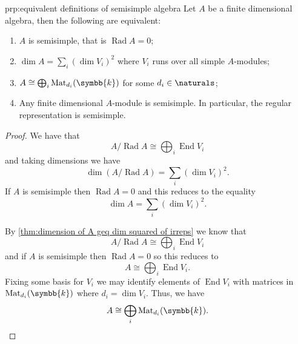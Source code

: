 \documentclass[fleqn]{NotesClass}
\renewcommand{\field}{\symbb{k}}
\DeclareMathOperator{\End}{End}
\newcommand{\isomorphic}{\cong}
\DeclareMathOperator{\Rad}{Rad}
\begin{document}
    \begin{prp}{}{prp:equivalent definitions of semisimple algebra}
        Let \(A\) be a finite dimensional algebra, then the following are equivalent:
        \begin{enumerate}[label=(\textsc{\roman*})]
            \item \(A\) is semisimple, that is \(\Rad A = 0\);
            \item \(\dim A = \sum_i (\dim V_i)^2\) where \(V_i\) runs over all simple \(A\)-modules;
            \item \(A \isomorphic \bigoplus_i \matrices{d_i}{\field}\) for some \(d_i \in \naturals\);
            \item Any finite dimensional \(A\)-module is semisimple.
            In particular, the regular representation is semisimple.
        \end{enumerate}
        \begin{proof}
            We have that
            \begin{equation}
                A/\Rad A \isomorphic \bigoplus_i \End V_i
            \end{equation}
            and taking dimensions we have
            \begin{equation}
                \dim(A/\Rad A) = \sum_i (\dim V_i)^2.
            \end{equation}
            If \(A\) is semisimple then \(\Rad A = 0\) and this reduces to the equality
            \begin{equation}
                \dim A = \sum_i (\dim V_i)^2.
            \end{equation}
            
            By \cref{thm:dimension of A geq dim squared of irreps} we know that
            \begin{equation}
                A/\Rad A \isomorphic \bigoplus_i \End V_i
            \end{equation}
            and if \(A\) is semisimple then \(\Rad A = 0\) so this reduces to
            \begin{equation}
                A \isomorphic \bigoplus_i \End V_i.
            \end{equation}
            Fixing some basis for \(V_i\) we may identify elements of \(\End V_i\) with matrices in \(\matrices{d_i}{\field}\) where \(d_i = \dim V_i\).
            Thus, we have
            \begin{equation}
                A \isomorphic \bigoplus_i \matrices{d_i}{\field}.
            \end{equation}
            

\end{proof}
\end{prp}
\end{document}
